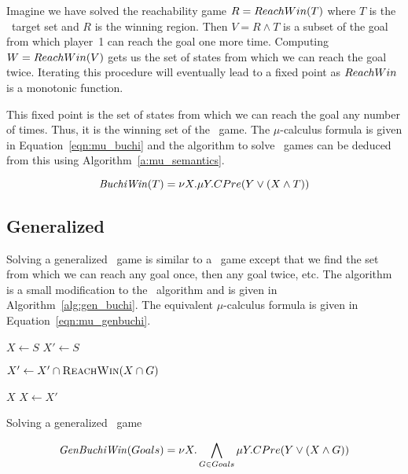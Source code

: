 Imagine we have solved the reachability game $R = ReachWin(T)$ where $T$ is the \buchi\ target set and $R$ is the winning region. Then $V = R \wedge T$ is a subset of the goal from which player~1 can reach the goal one more time. Computing $W = ReachWin(V)$ gets us the set of states from which we can reach the goal twice. Iterating this procedure will eventually lead to a fixed point as $ReachWin$ is a monotonic function.

This fixed point is the set of states from which we can reach the goal any number of times. Thus, it is the winning set of the \buchi\ game. The $\mu$-calculus formula is given in Equation~\ref{eqn:mu_buchi} and the algorithm to solve \buchi\ games can be deduced from this using Algorithm~\ref{a:mu_semantics}.

\begin{equation}
    \mathit{BuchiWin}(T) = \nu X. \mu Y. CPre(Y \vee (X \wedge T))
\label{eqn:mu_buchi}
\end{equation}

\subsection{Generalized \buchi}

Solving a generalized \buchi\ game is similar to a \buchi\ game except that we find the set from which we can reach any goal once, then any goal twice, etc. The algorithm is a small modification to the \buchi\ algorithm and is given in Algorithm~\ref{alg:gen_buchi}. The equivalent $\mu$-calculus formula is given in Equation~\ref{eqn:mu_genbuchi}.

\begin{algorithm}[t]
\begin{algorithmic}
\State $X \gets S$
\Loop
\State $X' \gets S$

\State $X' \gets X' \cap \Call{\reachFun}{X \cap G}$
\EndFor

\State\Return $X$\EndIf
\State $X \gets X'$

\EndLoop
\EndFunction
\end{algorithmic}
\caption{Solving a generalized \buchi\ game}
\label{alg:gen_buchi}
\end{algorithm}

\begin{equation}
    \mathit{GenBuchiWin}(Goals) = \nu X. \bigwedge_{G \in Goals} \mu Y. CPre(Y \vee (X \wedge G))
\label{eqn:mu_genbuchi}
\end{equation}

